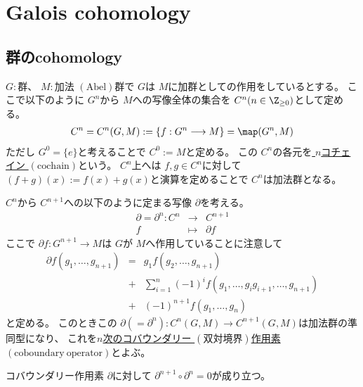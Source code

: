 \documentclass[../master_galois_theory]{subfiles}
\begin{document}
\setcounter{section}{13}

\section{Galois cohomology}

\subsection{群のcohomology}

\begin{defi} \label{defi:cochain}
  $G:$群、 $M:$加法 $(\mathrm{Abel})$群で
  $G$は $M$に加群としての作用をしているとする。
  ここで以下のように $G^n$から $M$への写像全体の集合を
  $C^n (n \in \Z_{\geq 0})$として定める。
  \begin{eqnarray*}
    C^n = C^n(G,M) := \{ f : G^n \longrightarrow M \} = \map(G^n,M)
  \end{eqnarray*}
  ただし $G^0 = \{ e \}$と考えることで $C^0 := M$と定める。
  この $C^n$の各元を\underline{ $n$コチェイン $(\mathrm{cochain})$}という。
  $C^n$上へは $f , g \in C^n$に対して
  $(f+g)(x) := f(x) + g(x)$と演算を定めることで $C^n$は加法群となる。
\end{defi}

\begin{defi} \label{defi:coboundary}
  $C^n$から $C^{n+1}$への以下のように定まる写像 $\partial$を考える。
  \begin{eqnarray*}
    \partial = \partial^n : C^n & \longrightarrow & C^{n+1} \\
    f & \longmapsto & \partial f
  \end{eqnarray*}
  ここで $\partial f : G^{n+1} \longrightarrow M$は
  $G$が $M$へ作用していることに注意して
  \begin{eqnarray*}
    \partial f(g_1 , \dots , g_{n+1}) & = & g_1 f(g_2 , \dots , g_{n+1}) \\
    & + & \sum_{i=1}^n (-1)^i f(g_1 , \dots , g_i g_{i+1} , \dots , g_{n+1}) \\
    & + & (-1)^{n+1} f(g_1 , \dots , g_n)
  \end{eqnarray*}
と定める。
このときこの $\partial (= \partial^n) : C^n(G,M) \longrightarrow C^{n+1}(G,M)$は加法群の準同型になり、
これを\underline{$n$次のコバウンダリー $(双対境界)$作用素 $(\mathrm{coboundary \  operator})$}とよぶ。
\end{defi}

\begin{prop} \label{prop:partialpartial}
  コバウンダリー作用素 $\partial$に対して $\partial^{n+1} \circ \partial^n = 0$が成り立つ。
\end{prop}
\end{document}
